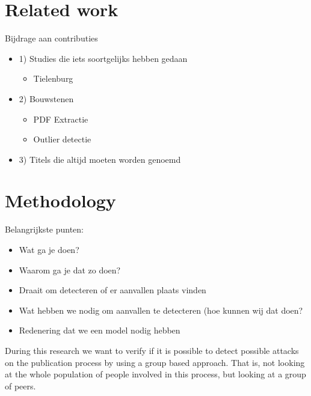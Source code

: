 \documentclass{ou-report}
\newcommand{\outline}[1]{{\color{blue} #1}}
\begin{document}
\chapter{Related work}
\label{chp:related_work}
\outline{
Bijdrage aan contributies
\begin{itemize}
    \item 1) Studies die iets soortgelijks hebben gedaan
    \begin{itemize}
        \item Tielenburg
    \end{itemize}
    \item 2) Bouwstenen
    \begin{itemize}
        \item PDF Extractie
        \item Outlier detectie
    \end{itemize}
    \item 3) Titels die altijd moeten worden genoemd
\end{itemize}
}


\chapter{Methodology}
\label{chp:methodology}
Belangrijkste punten:
\outline{
\begin{itemize}
    \item Wat ga je doen?
    \item Waarom ga je dat zo doen?
\end{itemize}
\begin{itemize}
    \item Draait om detecteren of er aanvallen plaats vinden
    \item Wat hebben we nodig om aanvallen te detecteren (hoe kunnen wij dat 
    doen?
    \item Redenering dat we een model nodig hebben
\end{itemize}
}

During this research we want to verify if it is possible to detect possible
attacks on the publication process by using a group based approach. That is,
not looking at the whole population of people involved in this process, but
looking at a group of peers.

\end{document}
